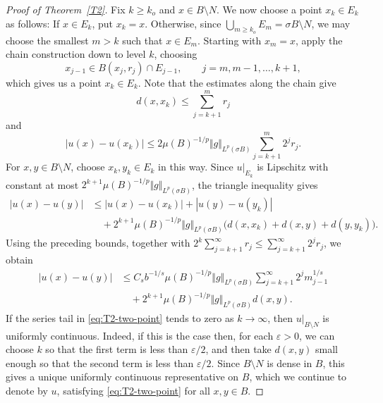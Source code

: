 \documentclass[10pt,a4paper]{amsart}
\begin{document}
\begin{proof}[Proof of Theorem~\ref{T2}]
Fix $k\geq k_o$ and $x\in B\setminus N$. 
We now choose a point $x_k\in E_k$ as follows:
If $x\in E_k$, put $x_k=x$.
Otherwise, since $\bigcup_{m\geq k_o}E_m=\sigma B\setminus N$,
we may choose the smallest $m>k$ such that $x\in E_m$. Starting with $x_m=x$,
apply the chain construction down to level $k$, choosing
\[
 x_{j-1}\in B(x_j,r_j)\cap E_{j-1},
 \qquad j=m,m-1,\ldots,k+1,
\]
which gives us a point $x_k\in E_k$. Note that the estimates along the chain give
\[
 d(x,x_k)\leq\sum_{j=k+1}^m r_j
\]
and
\[
 |u(x)-u(x_k)|
 \leq 2\mu(B)^{-1/p}\Vert g\Vert_{L^p(\sigma B)}
       \sum_{j=k+1}^m2^jr_j.
\]
For $x,y\in B\setminus N$, choose $x_k,y_k\in E_k$ in this way.
Since $u|_{E_k}$ is Lipschitz with constant at most
$2^{k+1}\mu(B)^{-1/p}\Vert g\Vert_{L^p(\sigma B)}$, the triangle
inequality gives
\[
\begin{split}
 |u(x)-u(y)|
 &\leq |u(x)-u(x_k)|+|u(y)-u(y_k)|\\
 &\quad+2^{k+1}\mu(B)^{-1/p}\Vert g\Vert_{L^p(\sigma B)}
 \bigl(d(x,x_k)+d(x,y)+d(y,y_k)\bigr).
\end{split}
\]
Using the preceding bounds, together with
$2^k\sum_{j=k+1}^{\infty}r_j\leq\sum_{j=k+1}^{\infty}2^jr_j$, we obtain
\begin{equation}
\label{eq:T2-two-point}
\begin{split}
 |u(x)-u(y)|
 &\leq C_s b^{-1/s}\mu(B)^{-1/p}\Vert g\Vert_{L^p(\sigma B)}
       \sum_{j=k+1}^{\infty}2^jm_{j-1}^{1/s}\\
 &\quad+2^{k+1}\mu(B)^{-1/p}\Vert g\Vert_{L^p(\sigma B)}d(x,y).
\end{split}
\end{equation}
If the series tail in \eqref{eq:T2-two-point} tends to zero as
$k\to\infty$, then $u|_{B\setminus N}$ is uniformly continuous.
Indeed, if this is the case then, for each $\varepsilon>0$, we can choose $k$ so that the first term is less than $\varepsilon/2$, and then take $d(x,y)$ small enough so that the second term is less than $\varepsilon/2$. Since $B\setminus N$ is dense in $B$, this gives a unique uniformly continuous representative on $B$, which we continue to denote by $u$, satisfying \eqref{eq:T2-two-point} for all $x,y\in B$.



\end{proof}
\end{document}
